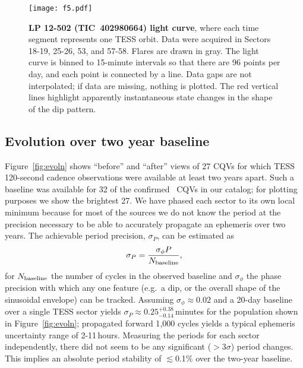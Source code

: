 \documentclass[11pt,twocolumn,tighten]{aastex63}
\begin{document}
\begin{figure*}[!tp]
	\begin{center}
		\centering
		\texttt{[image: f5.pdf]}
		\vspace{-0.3cm}
		\caption{
      {\bf LP 12-502 (TIC~402980664) light curve}, where each time
      segment represents one TESS orbit.  Data were acquired in Sectors
      18-19, 25-26, 53, and 57-58.  Flares are drawn in gray.  The
      light curve is binned to 15-minute intervals so that there are
      96 points per day, and each point is connected by a line.  Data
      gaps are not interpolated; if data are missing, nothing
      is plotted.  The red vertical lines highlight apparently
      instantaneous state changes in the shape of the dip pattern.  
		}
		\label{fig:lplc}
	\end{center}
\end{figure*}


\subsection{Evolution over two year baseline}

Figure~\ref{fig:evoln} shows ``before'' and ``after'' views of 27 CQVs
for which TESS 120-second cadence observations were available at least
two years apart.  Such a baseline was available for 32 of the
confirmed \ngoods\ CQVs in our catalog; for plotting purposes we show
the brightest 27.  We have phased each sector to its own local minimum
because for most of the sources we do not know the period at the
precision necessary to be able to accurately propagate an ephemeris
over two years.  The achievable period precision, $\sigma_P$, can be
estimated as
\begin{equation}
  \sigma_{P} = \frac { \sigma_{\phi} P } { N_{\rm baseline} },
  \label{eq:periodprecision}
\end{equation}
for $N_{\rm baseline}$ the number of cycles in the observed baseline
and $\sigma_{\phi}$ the phase precision with which any one feature
(e.g.~a dip, or the overall shape of the sinusoidal envelope) can be
tracked.  Assuming $\sigma_\phi$$\approx$$0.02$ and a 20-day baseline
over a single TESS sector yields
$\sigma_{P}$$\approx$$0.25^{+0.38}_{-0.14}$\,minutes for the
population shown in Figure~\ref{fig:evoln}; propagated forward 1{,}000
cycles yields a typical ephemeris uncertainty range of 2-11\,hours.
Measuring the periods for each sector independently, there did not
seem to be any significant ($>$3$\sigma$) period changes.  This
implies an absolute period stability of $\lesssim$0.1\% over the
two-year baseline.
\end{document}
